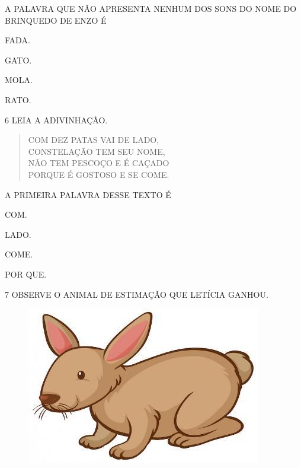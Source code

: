 
A PALAVRA QUE NÃO APRESENTA NENHUM DOS SONS DO NOME DO BRINQUEDO DE ENZO É

\begin{multicols}{2}
\begin{escolha}
\item FADA.

\item GATO.

\item MOLA.

\item RATO.
\end{escolha}
\end{multicols}

\num{6} LEIA A ADIVINHAÇÃO. 

\begin{myquote}
\begin{verse}
COM DEZ PATAS VAI DE LADO,\\
CONSTELAÇÃO TEM SEU NOME,\\
NÃO TEM PESCOÇO E É CAÇADO\\
PORQUE É GOSTOSO E SE COME.
\end{verse}

\end{myquote}

A PRIMEIRA PALAVRA DESSE TEXTO É

\begin{escolha}
\item COM.

\item LADO.

\item COME.

\item POR QUE.
\end{escolha}


\num{7} OBSERVE O ANIMAL DE ESTIMAÇÃO QUE LETÍCIA GANHOU.

\begin{figure}[H]
\centering
\includegraphics[width=.4\textwidth]{media/image246.jpg}
\end{figure}

